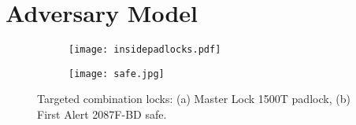 \documentclass[]{IEEEtran}
\begin{document}




\section{Adversary Model}
\label{adversary}

\begin{figure}[b]
\centering
\begin{subfigure}[b]{0.33\linewidth}
\texttt{[image: insidepadlocks.pdf]}
\caption{}
\label{insidepadlocks}
\end{subfigure}
\quad\quad
\begin{subfigure}[b]{0.25\linewidth}
\texttt{[image: safe.jpg]}
\caption{}
\label{safefig}
\end{subfigure}
\caption{Targeted combination locks: (a) Master Lock 1500T padlock, (b) First Alert 2087F-BD safe.}
\label{lockfigs}
\end{figure}
\end{document}
